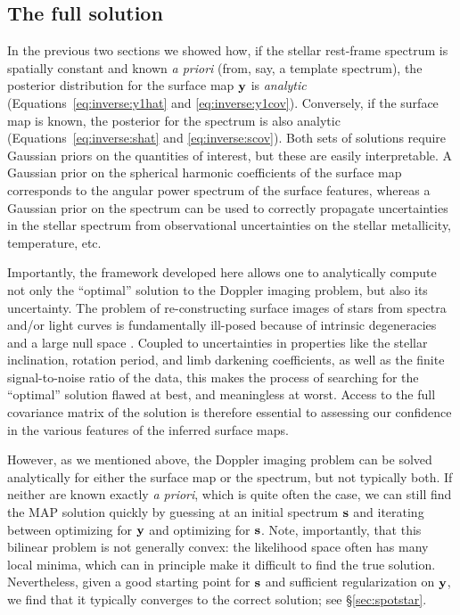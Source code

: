 \documentclass[modern]{aastex631}
\begin{document}
\subsection{The full solution}
\label{sec:full_solve}
%
In the previous two sections we showed how, if the stellar rest-frame spectrum is spatially constant and known \emph{a priori} (from, say, a template spectrum), the posterior distribution for the surface map ${\mathbf{y}}$ is \emph{analytic} (Equations~\ref{eq:inverse:y1hat} and \ref{eq:inverse:y1cov}). 
Conversely, if the surface map is known, the posterior for the spectrum is also analytic (Equations~\ref{eq:inverse:shat} and \ref{eq:inverse:scov}). 
Both sets of solutions require Gaussian priors on the quantities of interest, but these are easily interpretable. 
A Gaussian prior on the spherical harmonic coefficients of the surface map corresponds to the angular power spectrum of the surface features, whereas a Gaussian prior on the spectrum can be used to correctly propagate uncertainties in the stellar spectrum from observational uncertainties on the stellar metallicity, temperature, etc.

Importantly, the framework developed here allows one to analytically compute not only the ``optimal'' solution to the Doppler imaging problem, but also its uncertainty. 
The problem of re-constructing surface images of stars from spectra and/or light curves is fundamentally ill-posed because of intrinsic degeneracies and a large null space \citep[e.g.,][]{Cowan2017,Luger2019,Luger2021a}. 
Coupled to uncertainties in properties like the stellar inclination, rotation period, and limb darkening coefficients, as well as the finite signal-to-noise ratio of the data, this makes the process of searching for the ``optimal'' solution flawed at best, and meaningless at worst. 
Access to the full covariance matrix of the solution is therefore essential to assessing our confidence in the various features of the inferred surface maps.

However, as we mentioned above, the Doppler imaging problem can be solved analytically for either the surface map or the spectrum, but not typically both. 
If neither are known exactly \emph{a priori}, which is quite often the case, we can still find the MAP solution quickly by guessing at an initial spectrum ${\mathbf{s}}$ and iterating between optimizing for ${\mathbf{y}}$ and optimizing for ${\mathbf{s}}$. 
Note, importantly, that this bilinear problem is not generally convex: the likelihood space often has many local minima, which can in principle make it difficult to find the true solution.
Nevertheless, given a good starting point for ${\mathbf{s}}$ and sufficient regularization on ${\mathbf{y}}$, we find that it typically converges to the correct solution; see \S\ref{sec:spotstar}.
\end{document}
